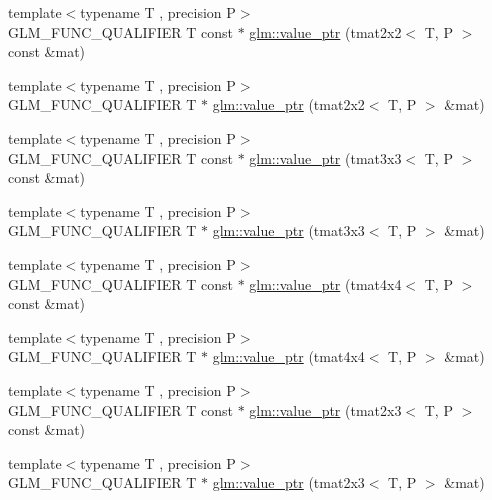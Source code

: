 \begin{DoxyCompactItemize}
\item 
{\footnotesize template$<$typename T , precision P$>$ }\\G\+L\+M\+\_\+\+F\+U\+N\+C\+\_\+\+Q\+U\+A\+L\+I\+F\+I\+ER T const  $\ast$ \hyperlink{group__gtc__type__ptr_ga2d709523aa0beb0a42433f80c9d07718}{glm\+::value\+\_\+ptr} (tmat2x2$<$ T, P $>$ const \&mat)
\item 
{\footnotesize template$<$typename T , precision P$>$ }\\G\+L\+M\+\_\+\+F\+U\+N\+C\+\_\+\+Q\+U\+A\+L\+I\+F\+I\+ER T $\ast$ \hyperlink{group__gtc__type__ptr_gac7256e14328e818e61276fa5e6176b9d}{glm\+::value\+\_\+ptr} (tmat2x2$<$ T, P $>$ \&mat)
\item 
{\footnotesize template$<$typename T , precision P$>$ }\\G\+L\+M\+\_\+\+F\+U\+N\+C\+\_\+\+Q\+U\+A\+L\+I\+F\+I\+ER T const  $\ast$ \hyperlink{group__gtc__type__ptr_ga0fd20ac385befba86cf2bbf836728bc2}{glm\+::value\+\_\+ptr} (tmat3x3$<$ T, P $>$ const \&mat)
\item 
{\footnotesize template$<$typename T , precision P$>$ }\\G\+L\+M\+\_\+\+F\+U\+N\+C\+\_\+\+Q\+U\+A\+L\+I\+F\+I\+ER T $\ast$ \hyperlink{group__gtc__type__ptr_ga4470e16d0e844cb2c4f7b2e731824f87}{glm\+::value\+\_\+ptr} (tmat3x3$<$ T, P $>$ \&mat)
\item 
{\footnotesize template$<$typename T , precision P$>$ }\\G\+L\+M\+\_\+\+F\+U\+N\+C\+\_\+\+Q\+U\+A\+L\+I\+F\+I\+ER T const  $\ast$ \hyperlink{group__gtc__type__ptr_ga2edadf5433694bf018d62db962b61321}{glm\+::value\+\_\+ptr} (tmat4x4$<$ T, P $>$ const \&mat)
\item 
{\footnotesize template$<$typename T , precision P$>$ }\\G\+L\+M\+\_\+\+F\+U\+N\+C\+\_\+\+Q\+U\+A\+L\+I\+F\+I\+ER T $\ast$ \hyperlink{group__gtc__type__ptr_ga1fc49ab60e5afdd4821a6903e92244a4}{glm\+::value\+\_\+ptr} (tmat4x4$<$ T, P $>$ \&mat)
\item 
{\footnotesize template$<$typename T , precision P$>$ }\\G\+L\+M\+\_\+\+F\+U\+N\+C\+\_\+\+Q\+U\+A\+L\+I\+F\+I\+ER T const  $\ast$ \hyperlink{group__gtc__type__ptr_ga968f2c8899914ea1c1daaaded8daa6b5}{glm\+::value\+\_\+ptr} (tmat2x3$<$ T, P $>$ const \&mat)
\item 
{\footnotesize template$<$typename T , precision P$>$ }\\G\+L\+M\+\_\+\+F\+U\+N\+C\+\_\+\+Q\+U\+A\+L\+I\+F\+I\+ER T $\ast$ \hyperlink{group__gtc__type__ptr_ga36fb9a17664c8b6848a5d005e4068a2f}{glm\+::value\+\_\+ptr} (tmat2x3$<$ T, P $>$ \&mat)

\end{DoxyCompactItemize}
